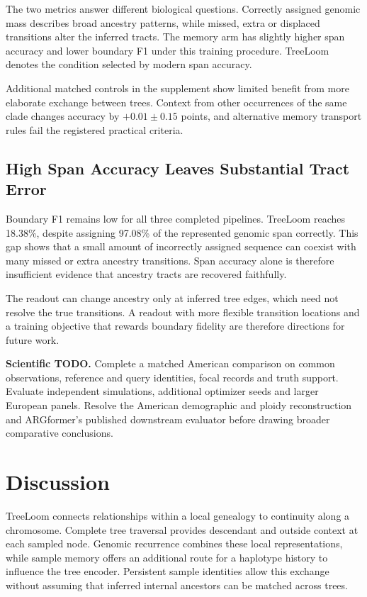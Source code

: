 \documentclass[letterpaper]{article}
\newcommand{\todo}[1]{\par\noindent\textbf{Scientific TODO.} #1\par}
\begin{document}
The two metrics answer different biological questions. Correctly assigned genomic mass describes broad ancestry patterns, while missed, extra or displaced transitions alter the inferred tracts. The memory arm has slightly higher span accuracy and lower boundary F1 under this training procedure. TreeLoom denotes the condition selected by modern span accuracy.

Additional matched controls in the supplement show limited benefit from more elaborate exchange between trees. Context from other occurrences of the same clade changes accuracy by $+0.01\pm0.15$ points, and alternative memory transport rules fail the registered practical criteria.

\subsection{High Span Accuracy Leaves Substantial Tract Error}
Boundary F1 remains low for all three completed pipelines. TreeLoom reaches 18.38\%, despite assigning 97.08\% of the represented genomic span correctly. This gap shows that a small amount of incorrectly assigned sequence can coexist with many missed or extra ancestry transitions. Span accuracy alone is therefore insufficient evidence that ancestry tracts are recovered faithfully.

The readout can change ancestry only at inferred tree edges, which need not resolve the true transitions. A readout with more flexible transition locations and a training objective that rewards boundary fidelity are therefore directions for future work.

\todo{Complete a matched American comparison on common observations, reference and query identities, focal records and truth support. Evaluate independent simulations, additional optimizer seeds and larger European panels. Resolve the American demographic and ploidy reconstruction and ARGformer's published downstream evaluator before drawing broader comparative conclusions.}

\section{Discussion}
TreeLoom connects relationships within a local genealogy to continuity along a chromosome. Complete tree traversal provides descendant and outside context at each sampled node. Genomic recurrence combines these local representations, while sample memory offers an additional route for a haplotype history to influence the tree encoder. Persistent sample identities allow this exchange without assuming that inferred internal ancestors can be matched across trees.
\end{document}
